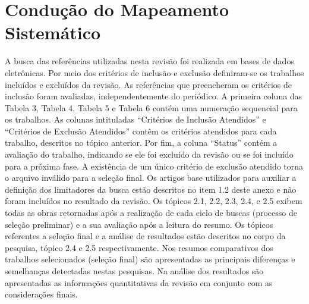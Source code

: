 \section{Condução do Mapeamento Sistemático} \label{RT - Condução do Mapeamento Sistemático}
\newline
\newline
\indent A busca das referências utilizadas nesta revisão foi realizada em bases de dados eletrônicas. Por meio dos critérios de inclusão e exclusão definiram-se os trabalhos incluídos e excluídos da revisão. As referências que preencheram os critérios de inclusão foram avaliadas, independentemente do periódico.\newline
\newline
\indent A primeira coluna das Tabela 3, Tabela 4, Tabela 5 e Tabela 6 contém uma numeração sequencial para os trabalhos. As colunas intituladas “Critérios de Inclusão Atendidos” e “Critérios de Exclusão Atendidos” contêm os critérios atendidos para cada trabalho, descritos no tópico anterior. Por fim, a coluna “Status” contém a avaliação do trabalho, indicando se ele foi excluído da revisão ou se foi incluído para a próxima fase. A existência de um único critério de exclusão atendido torna o arquivo inválido para a seleção final.\newline
\newline
\indent Os artigos base utilizados para auxiliar a definição dos limitadores da busca estão descritos no item 1.2 deste anexo e não foram incluídos no resultado da revisão.\newline
\newline
\indent Os tópicos 2.1, 2.2, 2.3, 2.4, e 2.5 exibem todas as obras retornadas após a realização de cada ciclo de buscas (processo de seleção preliminar) e a sua avaliação após a leitura do resumo.\newline
\newline
\indent Os tópicos referentes a seleção final e a análise de resultados estão descritos no corpo da pesquisa, tópico 2.4 e 2.5 respectivamente.\newline
\newline
\indent Nos resumos comparativos dos trabalhos selecionados (seleção final) são apresentadas as principais diferenças e semelhanças detectadas nestas pesquisas.\newline
\newline
\indent Na análise dos resultados são apresentadas as informações quantitativas da revisão em conjunto com as considerações finais.

